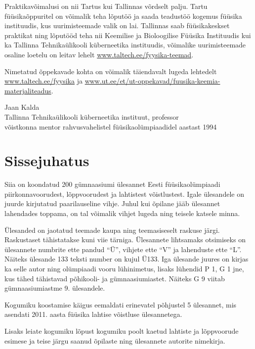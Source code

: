 \documentclass[11pt]{article}
\begin{document}
{{Praktikavõimalusi on nii Tartus kui Tallinnas võrdselt palju.
Tartu füüsikaõppuritel on võimalik teha lõputöö ja saada teadustöö kogemus füüsika instituudis, kus
uurimisteemade valik on lai.
Tallinnas saab füüsikakeskset praktikat ning lõputööd teha nii Keemilise ja Bioloogilise Füüsika Instituudis kui ka
Tallinna Tehnikaülikooli küberneetika instituudis, võimalike uurimisteemade osaline loetelu on leitav lehelt
\url{www.taltech.ee/fyysika-teemad}.

Nimetatud õppekavade kohta on võimalik täiendavalt lugeda lehtedelt
\url{www.taltech.ee/fyysika} ja
\url{www.ut.ee/et/ut-oppekavad/fuusika-keemia-materjaliteadus}.

\vspace{0.5\baselineskip}\noindent
Jaan Kalda\\
Tallinna Tehnikaülikooli küberneetika instituut, professor\\
võistkonna mentor rahvusvahelistel füüsikaolümpiaadidel aastast 1994}
\fussy

\tableofcontents
\newpage

{\setlength{\parindent}{24pt}
\section{Sissejuhatus}

Siia on koondatud 200 gümnaasiumi ülesannet Eesti füüsikaolümpiaadi piirkonnavoorudest, lõppvoorudest ja lahtistest võistlustest. Igale ülesandele on juurde kirjutatud paarilauseline vihje. Juhul kui õpilane jääb ülesannet lahendades toppama, on tal võimalik vihjet lugeda ning teisele katsele minna.

Ülesanded on jaotatud teemade kaupa ning teemasiseselt raskuse järgi. Raskustaset tähistatakse kuni viie tärniga. Ülesannete lihtsamaks otsimiseks on ülesannete numbrite ette pandud \enquote{Ü}, vihjete ette \enquote{V} ja lahenduste ette \enquote{L}. Näiteks ülesande 133 teksti number on kujul Ü133. Iga ülesande juures on kirjas ka selle autor ning olümpiaadi vooru lühinimetus, lisaks lühendid P 1, G 1 jne, kus tähed tähistavad põhikooli- ja gümnaasiumiastet. Näiteks G 9 viitab gümnaasiumiastme 9. ülesandele.

Kogumiku koostamise käigus eemaldati erinevatel põhjustel 5 ülesannet, mis asendati 2011. aasta füüsika lahtise võistluse ülesannetega.

Lisaks leiate kogumiku lõpust kogumiku poolt kaetud lahtiste ja lõppvoorude esimese ja teise järgu saanud õpilaste ning ülesannete autorite nimekirja.}
\newpage
\setlength{\parindent}{0pt}

}
\end{document}
